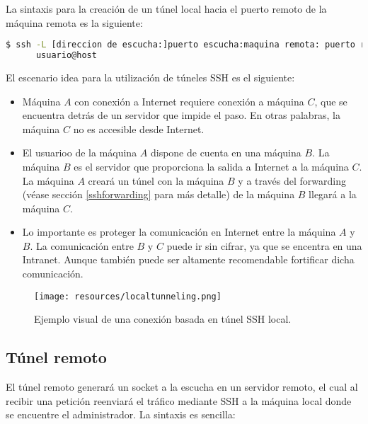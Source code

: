 \documentclass[a4paper, 11pt, titlepage]{article}
\begin{document}
        La sintaxis para la creación de un túnel local hacia el puerto remoto de la máquina remota es la 
        siguiente:
        
        \begin{lstlisting}[language=bash,basicstyle=\tiny]
    $ ssh -L [direccion de escucha:]puerto escucha:maquina remota: puerto remoto 
      usuario@host\end{lstlisting}
        
        El escenario idea para la utilización de túneles SSH es el siguiente:

        \begin{itemize}
            \item Máquina $A$ con conexión a Internet requiere conexión a máquina $C$, que se encuentra detrás 
            de un servidor que impide el paso. En otras palabras, la máquina $C$ no es accesible desde Internet.
            \item El usuarioo de la máquina $A$ dispone de cuenta en una máquina $B$. La máquina $B$ es el servidor 
            que proporciona la salida a Internet a la máquina $C$. La máquina $A$ creará un túnel con la máquina $B$ 
            y a través del forwarding (véase sección \ref{sshforwarding} para más detalle) de la máquina $B$ llegará 
            a la máquina $C$.
            \item Lo importante es proteger la comunicación en Internet entre la máquina $A$ y $B$. La comunicación 
            entre $B$ y $C$ puede ir sin cifrar, ya que se encentra en una Intranet. Aunque también puede ser altamente 
            recomendable fortificar dicha comunicación.
        \end{itemize}

        \begin{figure}[htp]
            \centering
            \texttt{[image: resources/localtunneling.png]}
            \caption{Ejemplo visual de una conexión basada en túnel SSH local.}
            \label{localtunneling}
        \end{figure}

    \subsection{Túnel remoto}

        El túnel remoto generará un socket a la escucha en un servidor remoto, el cual al recibir una petición 
        reenviará el tráfico mediante SSH a la máquina local donde se encuentre el administrador. La sintaxis es 
        sencilla:
\end{document}
